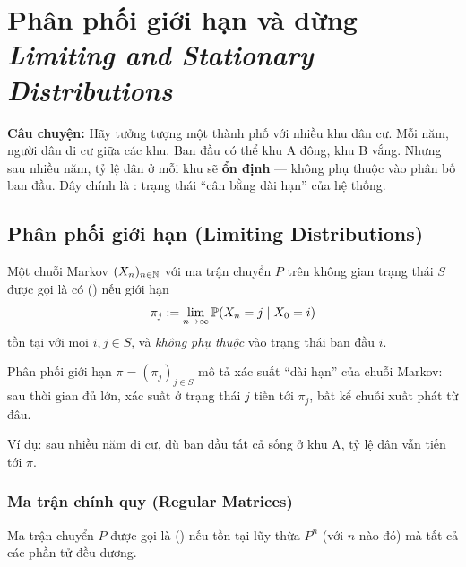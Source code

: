 \chapter{Phân phối giới hạn và dừng\\{\normalsize\textit{Limiting and Stationary Distributions}}}
\label{ch:limiting}

\textbf{Câu chuyện:} Hãy tưởng tượng một thành phố với nhiều khu dân cư. Mỗi năm, người dân di cư giữa các khu.
Ban đầu có thể khu A đông, khu B vắng. Nhưng sau nhiều năm, tỷ lệ dân ở mỗi khu sẽ \textbf{ổn định} ---
không phụ thuộc vào phân bố ban đầu. Đây chính là : trạng thái ``cân bằng dài hạn'' của hệ thống.

\section{Phân phối giới hạn (Limiting Distributions)}
\label{sec:limiting-dist}

\begin{dinhnghia}
Một chuỗi Markov $(X_n)_{n\in\mathbb{N}}$ với ma trận chuyển $P$ trên không gian trạng thái $S$
được gọi là có  () nếu giới hạn
\[
  \pi_j := \lim_{n\to\infty} \mathbb{P}(X_n = j \mid X_0 = i)
\]
tồn tại với mọi $i, j \in S$, và \emph{không phụ thuộc} vào trạng thái ban đầu $i$.
\end{dinhnghia}

\begin{tomtat}
Phân phối giới hạn $\pi = (\pi_j)_{j\in S}$ mô tả xác suất ``dài hạn'' của chuỗi Markov:
sau thời gian đủ lớn, xác suất ở trạng thái $j$ tiến tới $\pi_j$,
bất kể chuỗi xuất phát từ đâu.

Ví dụ: sau nhiều năm di cư, dù ban đầu tất cả sống ở khu A, tỷ lệ dân vẫn tiến tới $\pi$.
\end{tomtat}

\subsection{Ma trận chính quy (Regular Matrices)}
\label{subsec:regular-matrix}

\begin{dinhnghia}
Ma trận chuyển $P$ được gọi là  () nếu tồn tại
lũy thừa $P^n$ (với $n$ nào đó) mà tất cả các phần tử đều dương.
\end{dinhnghia}

